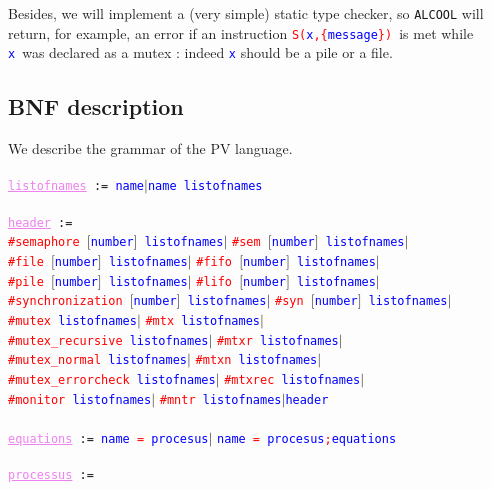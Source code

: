 \documentclass[article,11pt]{amsbook}
\def\wrn#1{\textcolor{red}{#1}}
\def\hil#1{\textcolor{blue}{#1}}
\def\voh#1{\textcolor{violet}{#1}}
\def\alcool{\texttt{ALCOOL} }
\def\pv{{\sf PV} }
\def\name{{\hil{\texttt{\scriptsize name}}}}
\def\numb{{\hil{\texttt{\scriptsize number}}}}
\def\ruledef#1{\voh{\underline{\texttt{#1}}}}
\def\rulecall#1{\hil{{\texttt{#1}}}}
\def\kw#1{\wrn{\texttt{#1}}}
\def\definer{\texttt{ := }}
\def\sendmess#1#2{{\scriptsize
\kw{S(}\rulecall{{#1}}\kw{,\{}\rulecall{{#2}}\kw{\})}}}
\begin{document}
\noindent Besides, we will implement a (very simple) static type
checker, so \alcool will return, for example, an error if an instruction
\sendmess{x}{message}\ is met while \rulecall{x}\ was declared as a mutex :
indeed \rulecall{x} should be a pile or a file.\newpage

\noindent 
\subsection{BNF description} We describe the grammar of the \pv
language.\\\ \\
{\scriptsize
\ruledef{listofnames}\definer\name{$\big|$}\name\texttt{
}\rulecall{listofnames}\\\ \\
\ruledef{header}\definer\\
\kw{\#semaphore }$[$\numb$]$\texttt{ }\rulecall{listofnames}{$\big|$}
\kw{\#sem }$[$\numb$]$\texttt{ }\rulecall{listofnames}{$\big|$}\\
\kw{\#file }$[$\numb$]$\texttt{ }\rulecall{listofnames}{$\big|$}
\kw{\#fifo }$[$\numb$]$\texttt{ }\rulecall{listofnames}{$\big|$}\\
\kw{\#pile }$[$\numb$]$\texttt{ }\rulecall{listofnames}{$\big|$}
\kw{\#lifo }$[$\numb$]$\texttt{ }\rulecall{listofnames}{$\big|$}\\
\kw{\#synchronization }$[$\numb$]$\texttt{ }\rulecall{listofnames}{$\big|$}
\kw{\#syn }$[$\numb$]$\texttt{ }\rulecall{listofnames}{$\big|$}\\
\kw{\#mutex }\rulecall{listofnames}{$\big|$}
\kw{\#mtx }\rulecall{listofnames}{$\big|$}\\
\kw{\#mutex\_recursive }\rulecall{listofnames}{$\big|$}
\kw{\#mtxr }\rulecall{listofnames}{$\big|$}\\
\kw{\#mutex\_normal }\rulecall{listofnames}{$\big|$}
\kw{\#mtxn }\rulecall{listofnames}{$\big|$}\\
\kw{\#mutex\_errorcheck }\rulecall{listofnames}{$\big|$}
\kw{\#mtxrec }\rulecall{listofnames}{$\big|$}\\
\kw{\#monitor }\rulecall{listofnames}{$\big|$}
\kw{\#mntr }\rulecall{listofnames}{$\big|$}\hil{{\texttt{header}}}
\\\ \\
\ruledef{equations}\definer\rulecall{name}\kw{ = }\rulecall{procesus}{$\big|$}
\rulecall{name}\kw{ = }\rulecall{procesus}\kw{;}\rulecall{equations}
\\ \ \\
\ruledef{processus}\definer\\
}
\end{document}
